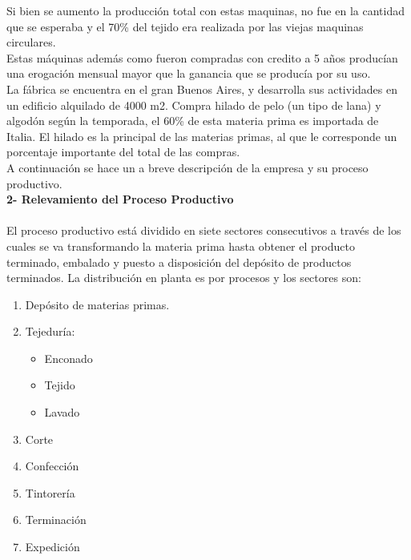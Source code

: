 \documentclass[a4paper,10pt,titlepage]{article}
\begin{document}
		\indent Si bien se aumento la producci\'on total con estas maquinas, no fue en la cantidad que se esperaba y el 70\% del tejido era realizada por las viejas maquinas circulares.\\
		\indent Estas m\'aquinas adem\'as como fueron compradas con credito a 5 años produc\'ian una erogaci\'on mensual mayor que la ganancia que se produc\'ia por su uso.\\
		\indent La f\'abrica se encuentra en el gran Buenos Aires, y desarrolla sus actividades en un edificio alquilado de 4000 m2. Compra hilado de pelo (un tipo de lana) y algod\'on seg\'un la temporada, el 60\% de esta materia prima es importada de Italia. El hilado es la principal de las materias primas, al que le corresponde un porcentaje importante del total de las compras.\\ 
		\indent A continuaci\'on se hace un a breve descripci\'on de la empresa y su proceso productivo.\\

	\vspace{0.5cm}
	 \textbf{2- Relevamiento del Proceso Productivo}\\ \\
		\indent El proceso productivo est\'a dividido en siete sectores consecutivos a trav\'es de los cuales se va transformando la materia prima hasta obtener el producto terminado, embalado y puesto a disposici\'on del dep\'osito de productos terminados. La distribuci\'on en planta es por procesos y los sectores son:\\
			\begin{enumerate}
			 \item Dep\'osito de materias primas.
			 \item Tejedur\'ia: 
				 \begin{itemize}
				 \item Enconado
 				 \item Tejido
 				 \item Lavado
				 \end{itemize}
 			 \item Corte
 			 \item Confecci\'on
 			 \item Tintorer\'ia
 			 \item Terminaci\'on
 			 \item Expedici\'on
			 \end{enumerate}
\end{document}
